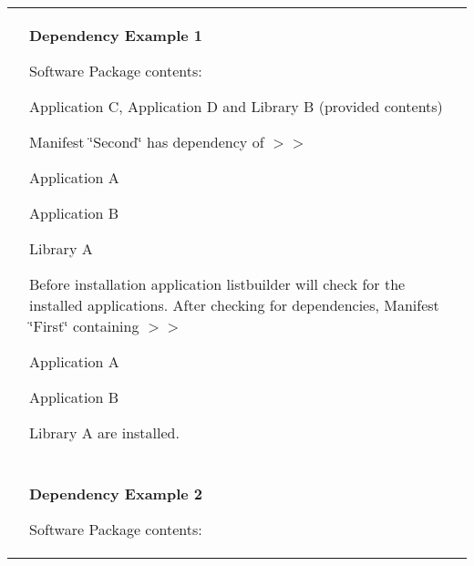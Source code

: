 \tabulinesep=1mm
\begin{longtabu} spread 0pt [c]{*2{|X[-1]}|}
\hline
 &

{\bfseries Dependency Example 1}



Software Package contents\+:


\begin{DoxyItemize}
\item Application C, Application D and Library B (provided contents)
\item Manifest \char`\"{}\+Second\char`\"{} has dependency of $>$$>$
\begin{DoxyItemize}
\item Application A
\item Application B
\item Library A
\end{DoxyItemize}
\item Before installation application listbuilder will check for the installed applications. After checking for dependencies, Manifest \char`\"{}\+First\char`\"{} containing $>$$>$
\begin{DoxyItemize}
\item Application A
\item Application B
\item Library A are installed.   
\end{DoxyItemize}
\end{DoxyItemize}\\
&\\
 &

{\bfseries Dependency Example 2}



Software Package contents\+:



\end{longtabu}
